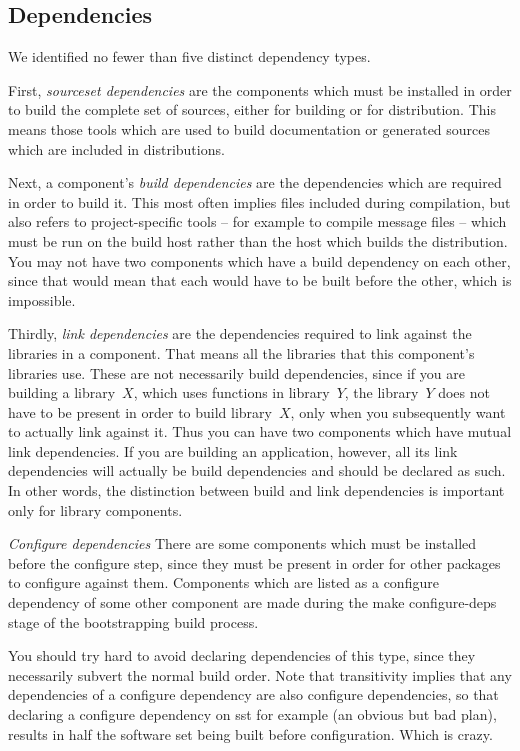 \documentclass{speauth}
\begin{document}
\subsection{Dependencies}
\label{s:deps}

We identified no fewer than five distinct dependency types.

First, \emph{sourceset dependencies} are the components which must be
installed in order to build the complete set of sources, either for
building or for distribution.  This means those tools which are used
to build documentation or generated sources which are included in distributions.

Next, a component's \emph{build dependencies} are the dependencies
which are required in order to build it.  This most often implies
files included during compilation, but also refers to project-specific
tools -- for example to compile message files -- which must be run on
the build host rather than the host which builds the distribution.
You may not have two components which have a build dependency on each
other, since that would mean that each would have to be built before
the other, which is impossible.

Thirdly, \emph{link dependencies} are the dependencies required to
link against the libraries in a component. That means all the
libraries that this component's libraries use. These are not
necessarily build dependencies, since if you are building a library~$X$,
which uses functions in library~$Y$, the library~$Y$ does not have to be
present in order to build library~$X$, only when you subsequently want
to actually link against it.  Thus you can have two components which
have mutual link dependencies.  If you are building an application,
however, all its link dependencies will actually be build dependencies
and should be declared as such. In other words, the distinction
between build and link dependencies is important only for library
components.

\emph{Configure dependencies}
There are some components which must be installed before the configure
step, since they must be present in order for other packages to
configure against them. Components which are listed as a configure
dependency of some other component are made during the make
configure-deps stage of the bootstrapping build process.

You should try hard to avoid declaring dependencies of this type,
since they necessarily subvert the normal build order. Note that
transitivity implies that any dependencies of a configure dependency
are also configure dependencies, so that declaring a configure
dependency on sst for example (an obvious but bad plan), results in
half the software set being built before configuration. Which is
crazy. 
\end{document}
